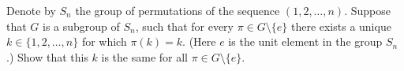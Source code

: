 \documentclass{article}
\begin{document}
\setlength{\parindent}{0pt}
Denote by $S_{n}$ the group of permutations of the sequence $(1,2,\dots,n)$. Suppose that $G$ is a subgroup of $S_{n}$, such that for every $\pi\in G\setminus\{e\}$ there exists a unique $k\in\{1,2,\dots,n\}$ for which $\pi(k)=k$. (Here $e$ is the unit element in the group $S_{n}$.) Show that this $k$ is the same for all $\pi\in G\setminus\{e\}.$
\end{document}
